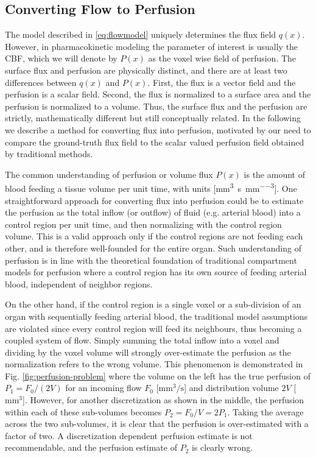 \documentclass[journal,twocolumn]{IEEEtran}
\newcommand{\Perf}{P}
\newcommand{\Flow}{F}
\newcommand{\siFmm}{\milli\meter\cubed\per\second}
\newcommand{\siQmm}{\milli\meter\cubed\per\second\per\milli\meter\cubed}
\newcommand{\simm}{\milli\meter\cubed}
\begin{document}
	

	\subsection{Converting Flow to Perfusion}\label{sec:flux2perf}
	The model described in \eqref{eq:flowmodel} uniquely determines the flux field $q(x)$. 
	However, in pharmacokinetic modeling the parameter of interest is usually the CBF, which we will denote by $\Perf (x)$ as the voxel wise field of perfusion. The surface flux and perfusion are physically distinct, and there are at least two differences between $q(x)$ and $\Perf (x)$. 
	First, the flux is a vector field and the perfusion is a scalar field. 
	Second, the flux is normalized to a surface area and the perfusion is normalized to a volume. 
	Thus, the surface flux and the perfusion are strictly, mathematically different but still conceptually related. 
	In the following we describe a method for converting flux into perfusion, motivated by our need to compare the ground-truth flux field to the scalar valued perfusion field obtained by traditional methods.

	The common understanding of perfusion or volume flux $\Perf (x)$ is the amount of blood feeding a tissue volume per unit time, with units [\si{\siQmm}]. 
	One straightforward approach for converting flux into perfusion could be to estimate the perfusion as the total inflow (or outflow) of fluid (e.g. arterial blood) into a control region per unit time, and then normalizing with the control region volume. 
	This is a valid approach only if the control regions are not feeding each other, and is therefore well-founded for the entire organ. 
	Such understanding of perfusion is in line with the theoretical foundation of traditional compartment models for perfusion where a control region has its own source of feeding arterial blood, independent of neighbor regions. 
	
	On the other hand, if the control region is a single voxel or a sub-division of an organ with sequentially feeding arterial blood, the traditional model assumptions are violated since every control region will feed its neighbours, thus becoming a coupled system of flow. 
	Simply summing the total inflow into a voxel and dividing by the voxel volume will strongly over-estimate the perfusion as the normalization refers to the wrong volume. 
	This phenomenon is demonstrated in Fig. \ref{fig:perfusion-problem} where the volume on the left has the true perfusion of $\Perf_{1} = \Flow_0 /(2V)$ for an incoming flow $\Flow_0$ [$\si{\siFmm}$] and distribution volume $2V$ [$\si{\simm}$]. 
	However, for another discretization as shown in the middle, the perfusion within each of these sub-volumes becomes $\Perf_{2} = F_0/V = 2\Perf_{1}$. 
	Taking the average across the two sub-volumes, it is clear that the perfusion is over-estimated with a factor of two. 
	A discretization dependent perfusion estimate is not recommendable, and the perfusion estimate of $\Perf_{2}$ is clearly wrong. 
\end{document}
